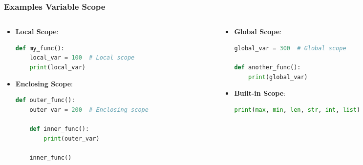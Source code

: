 \begin{frame}[fragile]
  \frametitle{Examples Variable Scope}
  \begin{columns}[T]
  
    \begin{column}{0.5\textwidth}
      \begin{itemize}
        \item \textbf{Local Scope}:
        \begin{lstlisting}[language=Python, basicstyle=\scriptsize]
def my_func():
    local_var = 100  # Local scope
    print(local_var)
        \end{lstlisting}

        \item \textbf{Enclosing Scope}:
        \begin{lstlisting}[language=Python, basicstyle=\scriptsize]
def outer_func():
    outer_var = 200  # Enclosing scope

    def inner_func():
        print(outer_var)

    inner_func()
        \end{lstlisting}
      \end{itemize}
    \end{column}

    \begin{column}{0.5\textwidth}
      \begin{itemize}
        \item \textbf{Global Scope}:
        \begin{lstlisting}[language=Python, basicstyle=\scriptsize]
global_var = 300  # Global scope

def another_func():
    print(global_var)
        \end{lstlisting}

        \item \textbf{Built-in Scope}:
        \begin{lstlisting}[language=Python, basicstyle=\scriptsize]
print(max, min, len, str, int, list)
        \end{lstlisting}
      \end{itemize}
    \end{column}

  \end{columns}
\end{frame}


